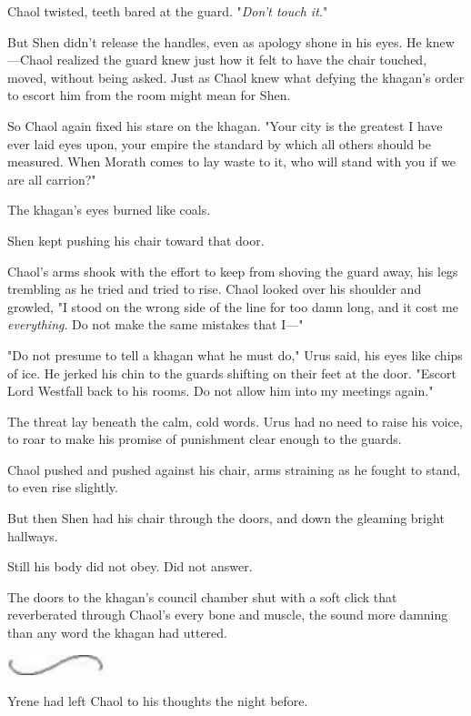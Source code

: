 Chaol twisted, teeth bared at the guard. "\emph{Don't touch it.}"

But Shen didn't release the handles, even as apology shone in his eyes. He knew---Chaol realized the guard knew just how it felt to have the chair touched, moved, without being asked. Just as Chaol knew what defying the khagan's order to escort him from the room might mean for Shen.

So Chaol again fixed his stare on the khagan. "Your city is the greatest I have ever laid eyes upon, your empire the standard by which all others should be measured. When Morath comes to lay waste to it, who will stand with you if we are all carrion?"

The khagan's eyes burned like coals.

Shen kept pushing his chair toward that door.

Chaol's arms shook with the effort to keep from shoving the guard away, his legs trembling as he tried and tried to rise. Chaol looked over his shoulder and growled, "I stood on the wrong side of the line for too damn long, and it cost me \emph{everything}. Do not make the same mistakes that I---"

"Do not presume to tell a khagan what he must do," Urus said, his eyes like chips of ice. He jerked his chin to the guards shifting on their feet at the door. "Escort Lord Westfall back to his rooms. Do not allow him into my meetings again."

The threat lay beneath the calm, cold words. Urus had no need to raise his voice, to roar to make his promise of punishment clear enough to the guards.

Chaol pushed and pushed against his chair, arms straining as he fought to stand, to even rise slightly.

But then Shen had his chair through the doors, and down the gleaming bright hallways.

Still his body did not obey. Did not answer.

The doors to the khagan's council chamber shut with a soft click that reverberated through Chaol's every bone and muscle, the sound more damning than any word the khagan had uttered.

\includegraphics[width=1.12in,height=0.24in]{images/seperator}

Yrene had left Chaol to his thoughts the night before.

